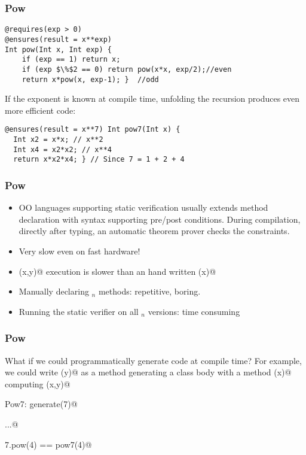 
\begin{frame}[fragile]
\frametitle{Pow}

\begin{lstlisting}
@requires(exp > 0)
@ensures(result = x**exp)
Int pow(Int x, Int exp) {
	if (exp == 1) return x;
	if (exp $\%$2 == 0) return pow(x*x, exp/2);//even
	return x*pow(x, exp-1); }  //odd
\end{lstlisting}
If the exponent is known at compile time,
unfolding the recursion produces even more efficient code:
\vspace{-1ex}
\begin{lstlisting}
@ensures(result = x**7) Int pow7(Int x) { 
  Int x2 = x*x; // x**2
  Int x4 = x2*x2; // x**4
  return x*x2*x4; } // Since 7 = 1 + 2 + 4
\end{lstlisting}

\end{frame}


\begin{frame}[fragile]
\frametitle{Pow}
\begin{itemize}
\item OO languages supporting static verification usually extends method
declaration with syntax supporting pre/post conditions. During
compilation, directly after typing, an automatic theorem prover
checks the constraints.
\item Very slow even on fast hardware!
\item \Q@pox(x,y)@ execution is slower than an hand written (x)@
\item Manually declaring \Q@pow@$_n$ methods: repetitive, boring.
\item Running the static verifier on all \Q@pow@$_n$ versions: time consuming
\end{itemize}
\end{frame}


\begin{frame}[fragile]
\frametitle{Pow}

What if we could programmatically generate code at compile time?
For example, we could write \Q@generate(y)@ as a method
generating a class body with a method \Q@pow(x)@ computing
\Q@pow(x,y)@

\Q@class Pow7: generate(7)@

\Q@...@

\Q@Pow7.pow(4) == pow7(4)@

\end{frame}


